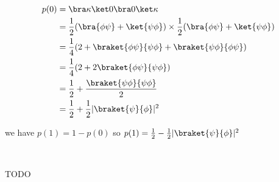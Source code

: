 \begin{align*}
  p(0) &= \bra \kappa \ket 0 \bra 0 \ket \kappa \\
  &= \frac 1 2 (\bra{\phi\psi} + \ket{\psi\phi}) \times
     \frac 1 2 (\bra{\phi\psi} + \ket{\psi\phi}) \\
  &= \frac 1 4 (2 + \braket{\phi\psi}{\psi\phi} + \braket{\psi\phi}{\phi\psi})\\
  &= \frac 1 4 (2 + 2\braket{\phi\psi}{\psi\phi})\\
  &= \frac 1 2 + \frac{\braket{\psi\phi}{\psi\phi}}{2}\\
  &= \frac 1 2 + \frac 1 2 |\braket{\psi}{\phi}|^2\\
\end{align*}

we have $p(1) = 1 - p(0)$ so $p(1) = \frac 1 2 - \frac 1 2
|\braket{\psi}{\phi}|^2$

~

TODO


